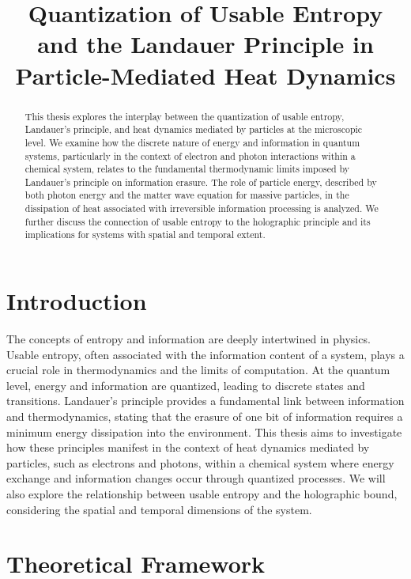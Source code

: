 	
	\title{Quantization of Usable Entropy and the Landauer Principle in Particle-Mediated Heat Dynamics}
	\author{}
	\date{}
	
	\begin{abstract}
		This thesis explores the interplay between the quantization of usable entropy, Landauer's principle, and heat dynamics mediated by particles at the microscopic level. We examine how the discrete nature of energy and information in quantum systems, particularly in the context of electron and photon interactions within a chemical system, relates to the fundamental thermodynamic limits imposed by Landauer's principle on information erasure. The role of particle energy, described by both photon energy and the matter wave equation for massive particles, in the dissipation of heat associated with irreversible information processing is analyzed. We further discuss the connection of usable entropy to the holographic principle and its implications for systems with spatial and temporal extent.
	\end{abstract}
	
	\section{Introduction}
	The concepts of entropy and information are deeply intertwined in physics. Usable entropy, often associated with the information content of a system, plays a crucial role in thermodynamics and the limits of computation. At the quantum level, energy and information are quantized, leading to discrete states and transitions. Landauer's principle provides a fundamental link between information and thermodynamics, stating that the erasure of one bit of information requires a minimum energy dissipation into the environment. This thesis aims to investigate how these principles manifest in the context of heat dynamics mediated by particles, such as electrons and photons, within a chemical system where energy exchange and information changes occur through quantized processes. We will also explore the relationship between usable entropy and the holographic bound, considering the spatial and temporal dimensions of the system.
	
	\section{Theoretical Framework}
	
